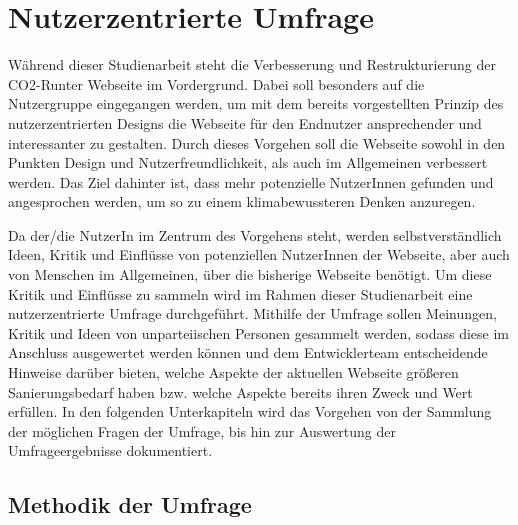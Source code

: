 \chapter{Nutzerzentrierte Umfrage}
\label{chapter:4}

Während dieser Studienarbeit steht die Verbesserung und Restrukturierung der CO2-Runter Webseite im Vordergrund.
Dabei soll besonders auf die Nutzergruppe eingegangen werden, um mit dem bereits vorgestellten Prinzip des nutzerzentrierten Designs die Webseite für den Endnutzer ansprechender und interessanter zu gestalten.
Durch dieses Vorgehen soll die Webseite sowohl in den Punkten Design und Nutzerfreundlichkeit, als auch im Allgemeinen verbessert werden.
Das Ziel dahinter ist, dass mehr potenzielle NutzerInnen gefunden und angesprochen werden, um so zu einem klimabewussteren Denken anzuregen.

Da der/die NutzerIn im Zentrum des Vorgehens steht, werden selbstverständlich Ideen, Kritik und Einflüsse von potenziellen NutzerInnen der Webseite, aber auch von Menschen im Allgemeinen, über die bisherige Webseite benötigt.
Um diese Kritik und Einflüsse zu sammeln wird im Rahmen dieser Studienarbeit eine nutzerzentrierte Umfrage durchgeführt.
Mithilfe der Umfrage sollen Meinungen, Kritik und Ideen von unparteiischen Personen gesammelt werden, sodass diese im Anschluss ausgewertet werden können und dem Entwicklerteam entscheidende Hinweise darüber bieten, welche Aspekte der aktuellen Webseite größeren Sanierungsbedarf haben bzw.
welche Aspekte bereits ihren Zweck und Wert erfüllen.
In den folgenden Unterkapiteln wird das Vorgehen von der Sammlung der möglichen Fragen der Umfrage, bis hin zur Auswertung der Umfrageergebnisse dokumentiert.


\section{Methodik der Umfrage}

